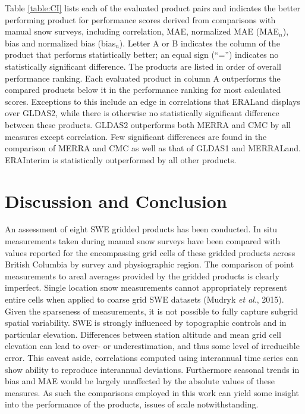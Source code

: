 \documentclass[12pt]{article}
\begin{document}
Table \ref{table:CI} lists each of the evaluated product pairs and indicates the better performing product for performance scores derived from comparisons with manual snow surveys, including correlation, MAE, normalized MAE (MAE$_n$), bias and normalized bias (bias$_n$).  Letter A or B indicates the column of the product that performs statistically better; an equal sign (``='') indicates no statistically significant difference.  The products are listed in order of overall performance ranking.  Each evaluated product in column A outperforms the compared products below it in the performance ranking for most calculated scores.  Exceptions to this include an edge in correlations that ERALand displays over GLDAS2, while there is otherwise no statistically significant difference between these products.  GLDAS2 outperforms both MERRA and CMC by all measures except correlation.  Few significant differences are found in the comparison of MERRA and CMC as well as that of GLDAS1 and MERRALand.  ERAInterim is statistically outperformed by all other products.


\section{Discussion and Conclusion}
An assessment of eight SWE gridded products has been conducted.  In situ measurements taken during manual snow surveys have been compared with values reported for the encompassing grid cells of these gridded products across British Columbia by survey and physiographic region.  The comparison of point measurements to areal averages provided by the gridded products is clearly imperfect.  Single location snow measurements cannot appropriately represent entire cells when applied to coarse grid SWE datasets (Mudryk \textit{et al}., 2015).  Given the sparseness of measurements, it is not possible to fully capture subgrid spatial variability.  SWE is strongly influenced by topographic controls and in particular elevation.  Differences between station altitude and mean grid cell elevation can lead to over- or underestimation, and thus some level of irreducible error.  This caveat aside, correlations computed using interannual time series can show ability to reproduce interannual deviations.  Furthermore seasonal trends in bias and MAE would be largely unaffected by the absolute values of these measures.  As such the comparisons employed in this work can yield some insight into the performance of the products, issues of scale notwithstanding.
\end{document}
